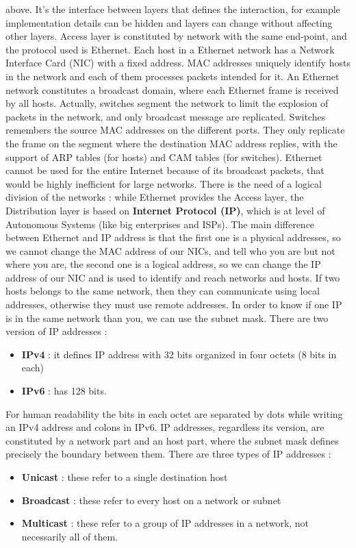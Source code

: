 \documentclass[11pt]{article}
\begin{document}
above. It's the interface between layers that defines the interaction, for example implementation details can be hidden and layers can change without affecting other layers. Access layer is constituted by network 
with the same end-point, and the protocol used is Ethernet. Each host in a Ethernet network has a Network Interface Card (NIC) with a fixed address. MAC addresses uniquely identify hosts in the network and each of them processes  packets intended for it. An Ethernet network constitutes a broadcast domain, where each Ethernet frame is received  by all hosts. Actually, switches segment the network to limit the explosion of packets in the network, and only  broadcast message are replicated. Switches remembers the source MAC addresses on the different ports. They only replicate the frame on the segment where the destination MAC address replies, with the support of ARP tables (for hosts) and CAM tables (for switches). Ethernet cannot be used for the entire Internet because of its broadcast packets, that would be highly inefficient for large networks. There is the need of a logical division of the networks : while Ethernet provides the Access layer, the Distribution layer is based on \textbf{Internet Protocol (IP)}, which is at level of Autonomous Systems (like big enterprises and ISPs). The main difference between Ethernet and IP address is that
the first one is a physical addresses, so we cannot change the MAC address of our NICs, and tell who you are but not where you are, the second one is a logical address, so we can change the IP address of our NIC and is used to identify and reach networks and hosts. If two hosts belongs to the same network, then they can communicate using
local addresses, otherwise they must use remote addresses. In order to know if one IP is in the same network than you, we can use the subnet mask. There are two version of IP addresses :
\begin{itemize}
\item \textbf{IPv4} : it defines IP address with 32 bits organized in four octets (8 bits in each)
\item \textbf{IPv6} : has 128 bits.
\end{itemize}
For human readability the bits in each octet are separated by dots while writing an IPv4 address and colons in IPv6. IP addresses, regardless its version, are constituted by a network part and an host part, where the subnet mask defines precisely the boundary between them. There are three types of IP addresses :
\begin{itemize}
\item \textbf{Unicast} : these refer to a single destination host
\item \textbf{Broadcast} : these refer to every host on a network or subnet
\item \textbf{Multicast} : these refer to a group of IP addresses in a network, not necessarily all of them.
\end{itemize}
\end{document}
